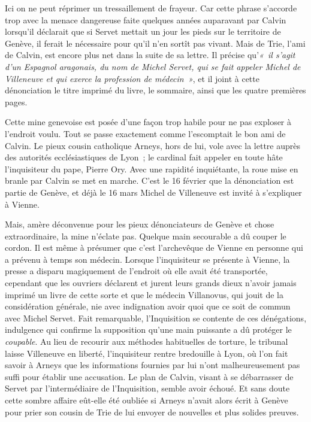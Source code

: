 \documentclass[french,twoside]{book} %
\begin{document}
Ici on ne peut réprimer un tressaillement de frayeur. Car cette phrase s’accorde trop avec la menace dangereuse faite quelques années auparavant par Calvin lorsqu’il déclarait que si Servet mettait un jour les pieds sur le territoire de Genève, il ferait le nécessaire pour qu’il n’en sortît pas vivant. Mais de Trie, l’ami de Calvin, est encore plus net dans la suite de sa lettre. Il précise qu’\emph{« il s’agit d’un Espagnol aragonais, du nom de Michel Servet, qui se fait appeler Michel de Villeneuve et qui exerce la profession de médecin »}, et il joint à cette dénonciation le titre imprimé du livre, le sommaire, ainsi que les quatre premières pages.\par
Cette mine genevoise est posée d’une façon trop habile pour ne pas exploser à l’endroit voulu. Tout se passe exactement comme l’escomptait le bon ami de Calvin. Le pieux cousin catholique Arneys, hors de lui, vole avec la lettre auprès des autorités ecclésiastiques de Lyon ; le cardinal fait appeler en toute hâte l’inquisiteur du pape, Pierre Ory. Avec une rapidité inquiétante, la roue mise en branle par Calvin se met en marche. C’est le 16 février que la dénonciation est partie de Genève, et déjà le 16 mars Michel de Villeneuve est invité à s’expliquer à Vienne.\par
Mais, amère déconvenue pour les pieux dénonciateurs de Genève et chose extraordinaire, la mine n’éclate pas. Quelque main secourable a dû couper le cordon. Il est même à présumer que c’est l’archevêque de Vienne en personne qui a prévenu à temps son médecin. Lorsque l’inquisiteur se présente à Vienne, la presse a disparu magiquement de l’endroit où elle avait été transportée, cependant que les ouvriers déclarent et jurent leurs grands dieux n’avoir jamais imprimé un livre de cette sorte et que le médecin Villanovus, qui jouit de la considération générale, nie avec indignation avoir quoi que ce soit de commun avec Michel Servet. Fait remarquable, l’Inquisition se contente de ces dénégations, indulgence qui confirme la supposition qu’une main puissante a dû protéger le \emph{coupable}. Au lieu de recourir aux méthodes habituelles de torture, le tribunal laisse Villeneuve en liberté, l’inquisiteur rentre bredouille à Lyon, où l’on fait savoir à Arneys que les informations fournies par lui n’ont malheureusement pas suffi pour établir une accusation. Le plan de Calvin, visant à se débarrasser de Servet par l’intermédiaire de l’Inquisition, semble avoir échoué. Et sans doute cette sombre affaire eût-elle été oubliée si Arneys n’avait alors écrit à Genève pour prier son cousin de Trie de lui envoyer de nouvelles et plus solides preuves.\par
\end{document}
